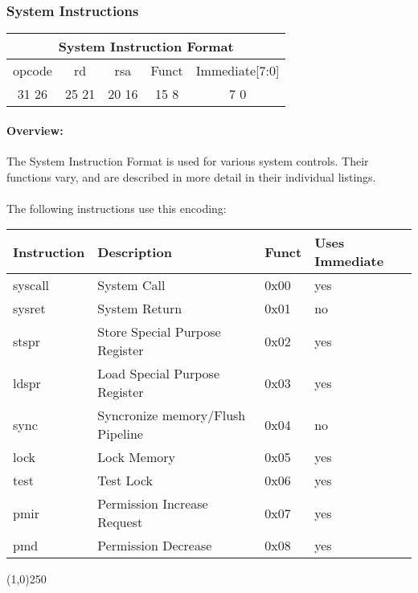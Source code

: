\documentclass[letterpaper, 11pt]{article}
\begin{document}
\newpage
\subsubsection{System Instructions}
\begin{center}
	\begin{tabular}{|c|c|c|c|c|}
		\multicolumn{5}{c}{System Instruction Format}\\ \hline
			\hspace{2pt} opcode \hspace{2pt} & \hspace{5pt} rd \hspace{5pt} &  \hspace{4pt} rsa \hspace{4pt} & \hspace{10pt}Funct  \hspace{10pt} & \hspace{8pt} Immediate[7:0] \hspace{8pt}   \\	\hline
		31 \hfill 26& 25 \hfill 21 &20 \hfill  16& 15 \hfill  8&7 \hfill   0\\ \hline
		
	\end{tabular}
\end{center}
\paragraph{Overview:} The System Instruction Format is used for various system controls. Their functions
vary, and are described in more detail in their individual listings.
\paragraph{}The following instructions use this encoding: \\
\begin{center}
	\begin{tabular}{|l|l|l|l|} \hline
			Instruction & Description 						& Funct & Uses Immediate\\ \hline
			syscall		& System Call						& 0x00  & yes \\ \hline
			sysret		& System Return						& 0x01  & no  \\ \hline
			stspr		& Store Special Purpose Register	& 0x02  & yes \\ \hline
			ldspr		& Load Special Purpose Register		& 0x03  & yes \\ \hline
			sync		& Syncronize memory/Flush Pipeline  & 0x04  & no  \\ \hline
			lock		& Lock Memory						& 0x05  & yes \\ \hline
			test		& Test Lock 						& 0x06  & yes \\ \hline
			pmir		& Permission Increase Request		& 0x07  & yes \\ \hline
			pmd			& Permission Decrease				& 0x08  & yes \\ \hline


\end{tabular}
\end{center}
\begin{center}
	\line(1,0){250}
\end{center}
\newpage
\end{document}
